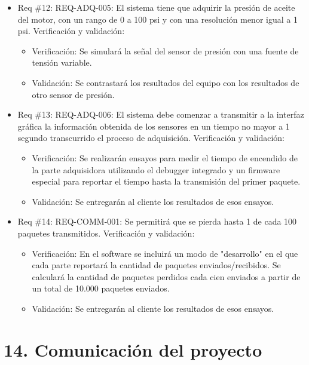 \documentclass[11pt]{charter}
\begin{document}
\begin{itemize} 
\item Req \#12: REQ-ADQ-005: El sistema tiene que adquirir la presión de aceite del motor, con
un rango de 0 a 100 psi y con una resolución menor igual a 1 psi.
Verificación y validación:
\begin{itemize}
\item Verificación: Se simulará la señal del sensor de presión con una fuente de tensión variable.
\item Validación: Se contrastará los resultados del equipo con los resultados de otro sensor de presión.
\end{itemize}
\end{itemize}

\begin{itemize} 
\item Req \#13: REQ-ADQ-006: El sistema debe comenzar a transmitir a la interfaz gráfica la
información obtenida de los sensores en un tiempo no mayor a 1 segundo transcurrido
el proceso de adquisición.
Verificación y validación:
\begin{itemize}
\item Verificación: Se realizarán ensayos para medir el tiempo de encendido de la parte adquisidora utilizando el debugger integrado y un firmware especial para reportar el tiempo hasta la transmisión del primer paquete.
\item Validación: Se entregarán al cliente los resultados de esos ensayos.
\end{itemize}
\end{itemize}

\begin{itemize} 
\item Req \#14: REQ-COMM-001: Se permitirá que se pierda hasta 1 de cada 100 paquetes
transmitidos.
Verificación y validación:
\begin{itemize}
\item Verificación: En el software se incluirá un modo de "desarrollo" en el que cada parte reportará la cantidad de paquetes enviados/recibidos. Se calculará la cantidad de paquetes perdidos cada cien enviados a partir de un total de 10.000 paquetes enviados.
\item Validación: Se entregarán al cliente los resultados de esos ensayos.
\end{itemize}
\end{itemize}

\section{14. Comunicación del proyecto}
\label{sec:comunicaciones}
\end{document}
